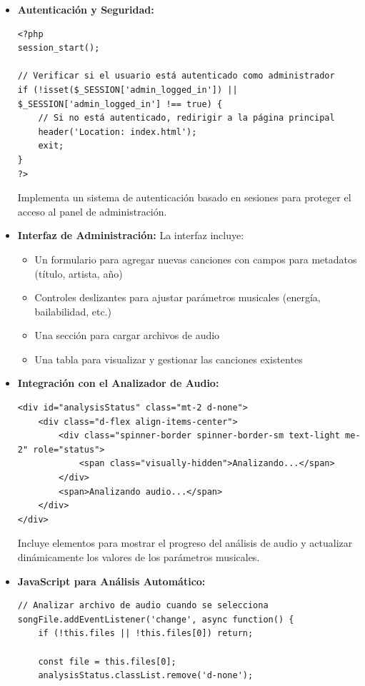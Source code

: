 \documentclass[a4paper,12pt]{article}
\begin{document}
\begin{itemize}
    \item \textbf{Autenticación y Seguridad:}
    \begin{verbatim}
<?php
session_start();

// Verificar si el usuario está autenticado como administrador
if (!isset($_SESSION['admin_logged_in']) || $_SESSION['admin_logged_in'] !== true) {
    // Si no está autenticado, redirigir a la página principal
    header('Location: index.html');
    exit;
}
?>
    \end{verbatim}
    Implementa un sistema de autenticación basado en sesiones para proteger el acceso al panel de administración.
    
    \item \textbf{Interfaz de Administración:}
    La interfaz incluye:
    \begin{itemize}
        \item Un formulario para agregar nuevas canciones con campos para metadatos (título, artista, año)
        \item Controles deslizantes para ajustar parámetros musicales (energía, bailabilidad, etc.)
        \item Una sección para cargar archivos de audio
        \item Una tabla para visualizar y gestionar las canciones existentes
    \end{itemize}
    
    \item \textbf{Integración con el Analizador de Audio:}
    \begin{verbatim}
<div id="analysisStatus" class="mt-2 d-none">
    <div class="d-flex align-items-center">
        <div class="spinner-border spinner-border-sm text-light me-2" role="status">
            <span class="visually-hidden">Analizando...</span>
        </div>
        <span>Analizando audio...</span>
    </div>
</div>
    \end{verbatim}
    Incluye elementos para mostrar el progreso del análisis de audio y actualizar dinámicamente los valores de los parámetros musicales.
    
    \item \textbf{JavaScript para Análisis Automático:}
    \begin{verbatim}
// Analizar archivo de audio cuando se selecciona
songFile.addEventListener('change', async function() {
    if (!this.files || !this.files[0]) return;
    
    const file = this.files[0];
    analysisStatus.classList.remove('d-none');
    

\end{verbatim}
\end{itemize}
\end{document}
